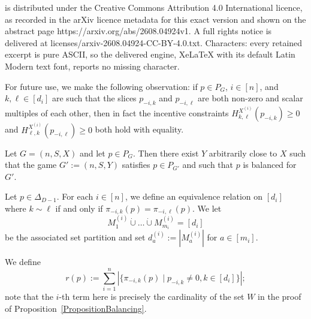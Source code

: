 \documentclass[10pt,a4paper]{amsart}
\begin{document}
is distributed under the Creative Commons Attribution 4.0 International licence, as recorded in the arXiv licence metadata for this exact version and shown on the abstract page https://arxiv.org/abs/2608.04924v1. A full rights notice is delivered at licenses/arxiv-2608.04924-CC-BY-4.0.txt. Characters: every retained excerpt is pure ASCII, so the delivered engine, XeLaTeX with its default Latin Modern text font, reports no missing character.
\begin{remark} \label{re:IncConsEq}
For future use, we make the following observation: if $p \in P_G$, $i \in
[n]$, and $k,\ell \in [d_i]$ are such that the slices $p_{-i,k}$ and $p_{-i,\ell}$
are both non-zero and scalar multiples of each other, then in fact the
incentive constraints $H^{X^{(i)}}_{k,\ell}(p_{-i,k}) \geq 0$ and
$H^{X^{(i)}}_{\ell,k}(p_{-i,\ell}) \geq 0$ both hold with equality.
\end{remark}

\begin{proposition}
\label{PropositionBalancing}
Let $G=(n,S,X)$ and let $p \in P_G$. Then there
exist $Y$ arbitrarily close to $X$ such that the game $G':=(n,S,Y)$
satisfies $p \in P_{G'}$ and such that $p$ is balanced for $G'$.
\end{proposition}

\begin{definition} \label{de:Partition}
Let $p \in \Delta_{D-1}$. For each $i \in [n]$, we define an
equivalence relation on $[d_i]$ where $k \sim \ell$ if and only if
$\pi_{-i,k}(p)=\pi_{-i,\ell}(p)$. We let \[M^{(i)}_1 \dot{\cup}
\dots \dot{\cup} M^{(i)}_{m_i} = [d_i]\] be the associated set
partition and set $d^{(i)}_a:=|M^{(i)}_a|$ for $a \in [m_i]$.



\noindent We define 
\begin{equation} \label{eq:rp} r(p):=\sum_{i=1}^n |\{ \pi_{-i,k}(p)
\mid p_{-i,k} \neq 0, k \in [d_i]   \}|; \end{equation}
note that the $i$-th term here is precisely the cardinality of the set
$W$ in the proof of Proposition~\ref{PropositionBalancing}.
\end{definition}
\end{document}
